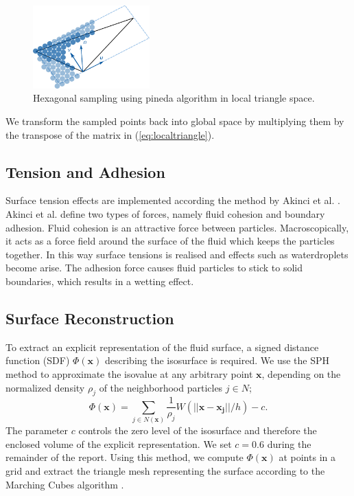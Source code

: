 \documentclass[11pt, letterpaper, twocolumn]{article}
\begin{document}
\begin{figure}[ht]
    \centering
    \includegraphics[width=0.4\textwidth]{images/triangle.pdf}
    \caption{Hexagonal sampling using pineda algorithm in local triangle space.}
    \label{fig:trianglesampling}
\end{figure}
We transform the sampled points back into global space by multiplying them by the transpose of the matrix in (\ref{eq:localtriangle}).

\subsection{Tension and Adhesion}
Surface tension effects are implemented according the method by Akinci et al. \cite{akinci2013}.
Akinci et al. define two types of forces, namely fluid cohesion and boundary adhesion. Fluid cohesion is an attractive force between particles. Macroscopically, it acts as a force field around the surface of the fluid which keeps the particles together. In this way surface tensions is realised and effects such as waterdroplets become arise. The adhesion force causes fluid particles to stick to solid boundaries, which results in a wetting effect.

\subsection{Surface Reconstruction}
To extract an explicit representation of the fluid surface, a signed distance function (SDF) \(\Phi(\mathbf{x}) \) describing the isosurface is required. We use the SPH method to approximate the isovalue at any arbitrary point \(\mathbf{x}\), depending on the normalized density \(\rho_j\) of the neighborhood particles \(j \in N\);
\begin{equation}
  \Phi(\mathbf{x})= \sum_{j \in N(\mathbf{x})}\frac{1}{\rho_j} W(||\mathbf{x} - \mathbf{x_j}|| / h) - c.
\end{equation}
The parameter \(c\) controls the zero level of the isosurface and therefore the enclosed volume of the explicit representation. We set \(c = 0.6\) during the remainder of the report. Using this method, we compute \(\Phi(\mathbf{x})\) at points in a grid and extract the triangle mesh representing the surface according to the Marching Cubes algorithm \cite{lorensen1987}.
\end{document}
